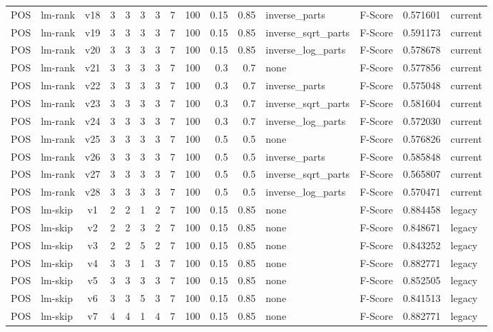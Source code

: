 \documentclass{article}
\begin{document}
\begin{xltabular}{\linewidth}{@{}lYcrrrrrrrrYlrl@{}}
POS & lm-rank & v18 & 3 & 3 & 3 & 3 & 7 & 100 & 0.15 & 0.85 & inverse\_parts & F-Score & 0.571601 & current \\
POS & lm-rank & v19 & 3 & 3 & 3 & 3 & 7 & 100 & 0.15 & 0.85 & inverse\_sqrt\_parts & F-Score & 0.591173 & current \\
POS & lm-rank & v20 & 3 & 3 & 3 & 3 & 7 & 100 & 0.15 & 0.85 & inverse\_log\_parts & F-Score & 0.578678 & current \\
POS & lm-rank & v21 & 3 & 3 & 3 & 3 & 7 & 100 & 0.3 & 0.7 & none & F-Score & 0.577856 & current \\
POS & lm-rank & v22 & 3 & 3 & 3 & 3 & 7 & 100 & 0.3 & 0.7 & inverse\_parts & F-Score & 0.575048 & current \\
POS & lm-rank & v23 & 3 & 3 & 3 & 3 & 7 & 100 & 0.3 & 0.7 & inverse\_sqrt\_parts & F-Score & 0.581604 & current \\
POS & lm-rank & v24 & 3 & 3 & 3 & 3 & 7 & 100 & 0.3 & 0.7 & inverse\_log\_parts & F-Score & 0.572030 & current \\
POS & lm-rank & v25 & 3 & 3 & 3 & 3 & 7 & 100 & 0.5 & 0.5 & none & F-Score & 0.576826 & current \\
POS & lm-rank & v26 & 3 & 3 & 3 & 3 & 7 & 100 & 0.5 & 0.5 & inverse\_parts & F-Score & 0.585848 & current \\
POS & lm-rank & v27 & 3 & 3 & 3 & 3 & 7 & 100 & 0.5 & 0.5 & inverse\_sqrt\_parts & F-Score & 0.565807 & current \\
POS & lm-rank & v28 & 3 & 3 & 3 & 3 & 7 & 100 & 0.5 & 0.5 & inverse\_log\_parts & F-Score & 0.570471 & current \\
POS & lm-skip & v1 & 2 & 2 & 1 & 2 & 7 & 100 & 0.15 & 0.85 & none & F-Score & 0.884458 & legacy \\
POS & lm-skip & v2 & 2 & 2 & 3 & 2 & 7 & 100 & 0.15 & 0.85 & none & F-Score & 0.848671 & legacy \\
POS & lm-skip & v3 & 2 & 2 & 5 & 2 & 7 & 100 & 0.15 & 0.85 & none & F-Score & 0.843252 & legacy \\
POS & lm-skip & v4 & 3 & 3 & 1 & 3 & 7 & 100 & 0.15 & 0.85 & none & F-Score & 0.882771 & legacy \\
POS & lm-skip & v5 & 3 & 3 & 3 & 3 & 7 & 100 & 0.15 & 0.85 & none & F-Score & 0.852505 & legacy \\
POS & lm-skip & v6 & 3 & 3 & 5 & 3 & 7 & 100 & 0.15 & 0.85 & none & F-Score & 0.841513 & legacy \\
POS & lm-skip & v7 & 4 & 4 & 1 & 4 & 7 & 100 & 0.15 & 0.85 & none & F-Score & 0.882771 & legacy \\

\end{xltabular}
\end{document}
